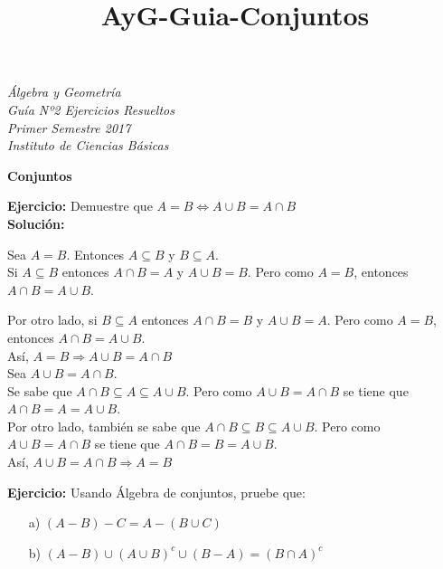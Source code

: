 \documentclass[a4paper,10pt]{article}
\title{AyG-Guia-Conjuntos}
\begin{document}
\begin{center}
\emph{Álgebra y Geometría} \\
\emph{Guía Nº2 Ejercicios Resueltos} \\
\emph{Primer Semestre 2017} \\
\emph{Instituto de Ciencias Básicas}
\end{center}

\begin{center}
\textbf{{\Large Conjuntos}}
\end{center}

\vspace{2mm}

\textbf{Ejercicio:} Demuestre que $ A=B \Longleftrightarrow A \cup B = A \cap B $ \\

\textbf{Solución:}

    \fbox{$\Longrightarrow$} Sea $A=B$. Entonces $A \subseteq B$ y $ B \subseteq A$. \\

    Si $A \subseteq B$ entonces $A \cap B = A$ y $A \cup B = B$. Pero como $A=B$, entonces $A \cap B = A \cup B$.

     Por otro lado, si $B \subseteq A$ entonces $A \cap B = B$ y $A \cup B = A$. Pero como $A=B$, entonces $A \cap B = A \cup B$. \\

     Así, $A=B \Longrightarrow A \cup B = A \cap B$\\

      \fbox{$\Longleftarrow$} Sea $A \cup B = A \cap B$. \\

      Se sabe que $A \cap B \subseteq A \subseteq A \cup B$. Pero como $A\cup B =A \cap B$ se tiene que $A \cap B = A = A\cup B$. \\

      Por otro lado, también se sabe que $A \cap B \subseteq B \subseteq A \cup B$. Pero como $A\cup B =A \cap B$ se tiene que $A \cap B = B = A\cup B$. \\

      Así, $ A \cup B = A \cap B \Longrightarrow A=B $
\vspace{5mm}







\textbf{Ejercicio:} Usando Álgebra de conjuntos, pruebe que:

                    \begin{enumerate}
                        \item[a)] $(A-B)-C = A-(B\cup C)$
                        \item[b)] $(A-B)\cup(A\cup B)^c\cup(B-A) = (B\cap A)^c$
                    \end{enumerate}
\end{document}
